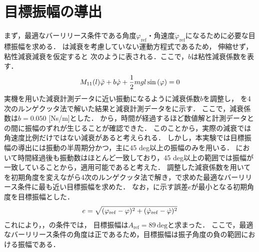         \section{目標振幅の導出}
          
          まず，最適なバーリリース条件である角度$\varphi_{\mathrm{ref}}$・角速度$\dot{\varphi}_{\mathrm{ref}}$になるために必要な目標振幅を求める．
          は減衰を考慮していない運動方程式であるため，
          伸縮せず，粘性減衰減衰を仮定すると
          次のように表される．ここで，$b$は粘性減衰係数を表す．
          \begin{eqnarray}
            \equlabel{dampingEquation}
            M_{11}(l)\ddot{\varphi}+b\dot{\varphi}+\frac{1}{2}mgl\sin{(\varphi)}=0          
            \end{eqnarray}
          実機を用いた減衰計測データに近い振動になるように減衰係数$b$を調整し，
          を4次のルンゲクッタ法で解いた結果と減衰計測データをに示す．
          ここで，減衰係数は$b=0.050$ [Ns/m]とした．
          から，時間が経過するほど数値解と計測データとの間に振幅のずれが生じることが確認できた．
          このことから，実際の減衰では角速度比例だけではない減衰があると考えられる．
          しかし，本実験では目標振幅の導出には振動の半周期分かつ，主に45 deg以上の振幅のみを用いる．
          において時間経過後も振動数はほとんど一致しており，45 deg以上の範囲では振幅が一致していることから，適用可能であると考えた．
          調整した減衰係数を用いてを初期角度を変えながら4次のルンゲクッタ法で解き，で求めた最適なバーリリース条件に最も近い目標振幅を求めた．
          なお，に示す誤差$e$が最小となる初期角度を目標振幅とした．
          \begin{eqnarray}
            \equlabel{error}
            e=\sqrt{(\varphi_{\mathrm{ref}}-\varphi)^2+(\dot{\varphi}_{\mathrm{ref}}-\dot{\varphi})^2}
            \end{eqnarray}
          これにより，，の条件では，
          目標振幅は$A_{\mathrm{ref}}=89\,\mathrm{deg}$と求まった．
          ここで，最適なバーリリース条件の角度は正であるため，目標振幅は振子角度の負の範囲における振幅である．

        





          



